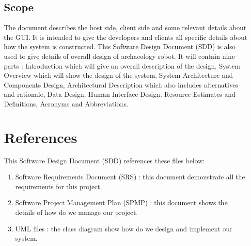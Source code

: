 \documentclass[11pt, a4paper]{report}
\begin{document}
\subsection{Scope}
The document describes the host side, client side and some relevant details about the GUI. It is intended to give the developers and clients all specific details about how the system is constructed. This Software Design Document (SDD) is also used to give details of overall design of archaeology robot. It will contain nine parts : Introduction which will give an overall description of the design, System Overview which will show the design of the system, System Architecture and Components Design, Architectural Description which also includes alternatives and rationale, Data Design, Human Interface Design, Resource Estimates and Definitions, Acronyms and Abbreviations.


\section{References}
This Software Design Document (SDD) references these files below:
\begin{enumerate}

  \item Software Requirements Document (SRS) : this document demonstrate all the requirements for this project.

  \item Software Project Management Plan (SPMP) : this document shows the details of how do we manage our project.

  \item UML files : the class diagram show how do we design and implement our system.

\end{enumerate}

\pagebreak
\end{document}
